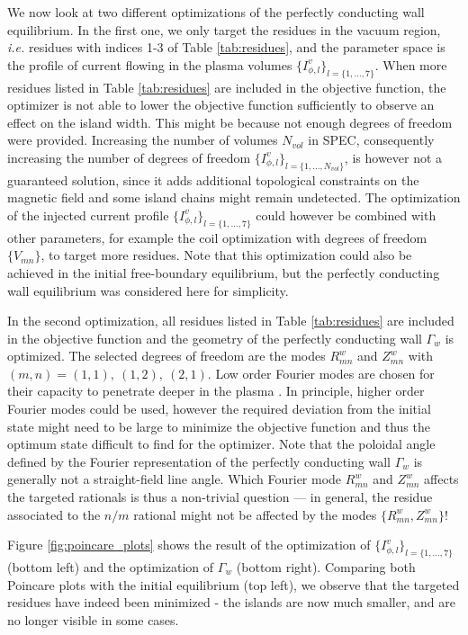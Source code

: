 \documentclass[my_thesis.tex]{subfiles}
\begin{document}
 We now look at two different optimizations of the perfectly conducting wall equilibrium. In the first one, we only target the residues in the vacuum region, \textit{i.e.} residues with indices 1-3 of Table \ref{tab:residues}, and the parameter space is the profile of current flowing in the plasma volumes $\{I^v_{\phi,l}\}_{l=\{1,\ldots,7\}}$. When more residues listed in Table \ref{tab:residues} are included in the objective function, the optimizer is not able to lower the objective function sufficiently to observe an effect on the island width. This might be because not enough degrees of freedom were provided. Increasing the number of volumes $N_{vol}$ in \ac{SPEC}, consequently increasing the number of degrees of freedom $\{I^v_{\phi,l}\}_{l=\{1,\ldots,N_{vol}\}}$, is however not a guaranteed solution, since it adds additional topological constraints on the magnetic field and some island chains might remain undetected. The optimization of the injected current profile $\{I^v_{\phi,l}\}_{l=\{1,\ldots,7\}}$ could however be combined with other parameters, for example the coil optimization with degrees of freedom $\{V_{mn}\}$, to target more residues. Note that this optimization could also be achieved in the initial free-boundary equilibrium, but the perfectly conducting wall equilibrium was considered here for simplicity.
 
 In the second optimization, all residues listed in Table \ref{tab:residues} are included in the objective function and the geometry of the perfectly conducting wall $\Gamma_w$ is optimized. The selected degrees of freedom are the modes $R^w_{mn}$ and $Z^w_{mn}$ with $(m,n)=(1,1),\ (1,2),\ (2,1)$. Low order Fourier modes are chosen for their capacity to penetrate deeper in the plasma \citep{Helander2014}. In principle, higher order Fourier modes could be used, however the required deviation from the initial state might need to be large to minimize the objective function and thus the optimum state difficult to find for the optimizer. Note that the poloidal angle defined by the Fourier representation of the perfectly conducting wall $\Gamma_w$ is generally not a straight-field line angle. Which Fourier mode $R^w_{mn}$ and $Z^w_{mn}$ affects the targeted rationals is thus a non-trivial question --- in general, the residue associated to the $n/m$ rational might not be affected by the modes $\{R^w_{mn},Z^w_{mn}\}$!

Figure \ref{fig:poincare_plots} shows the result of the optimization of $\{I^v_{\phi,l}\}_{l=\{1,\ldots,7\}}$ (bottom left) and the optimization of $\Gamma_w$ (bottom right). Comparing both Poincare plots with the initial equilibrium (top left), we observe that the targeted residues have indeed been minimized - the islands are now much smaller, and are no longer visible in some cases.
\end{document}
